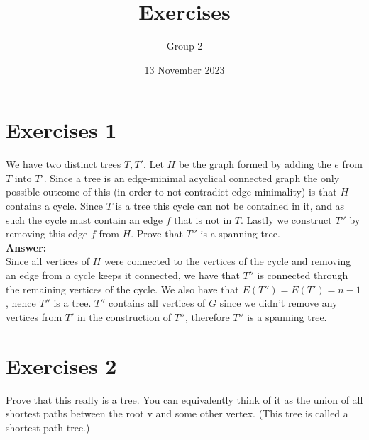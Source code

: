 \documentclass[nobib]{tufte-handout}
\title{Exercises}
\author[Group 2]{Group 2 }%
\date{13 November 2023}
\begin{document}
\maketitle%

\section{Exercises 1}
    We have two distinct trees $T, T'$. Let $H$ be the graph formed by adding the $e$ from $T$ into $T'$. Since a tree is an edge-minimal acyclical connected graph the only possible outcome of this (in order to not contradict edge-minimality) is that $H$ contains a cycle. Since $T$ is a tree this cycle can not be contained in it, and as such the cycle must contain an edge $f$ that is not in $T$. Lastly we construct $T''$ by removing this edge $f$ from $H$. Prove that $T''$ is a spanning tree. \\

    \textbf{Answer:} \\ 
    Since all vertices of $H$ were connected to the vertices of the cycle and removing an edge from a cycle keeps it connected, we have that $T''$ is connected through the remaining vertices of the cycle. We also have that $E(T'') = E(T') = n - 1$, hence $T''$ is a tree. $T''$ contains all vertices of $G$ since we didn't remove any vertices from $T'$ in the construction of $T''$, therefore $T''$ is a spanning tree.

\newpage

\section{Exercises 2}
  Prove that this really is a tree. You can equivalently think of it as the union of all shortest paths between the root v and some other vertex. (This tree is called a shortest-path tree.) \\
  
\end{document}
